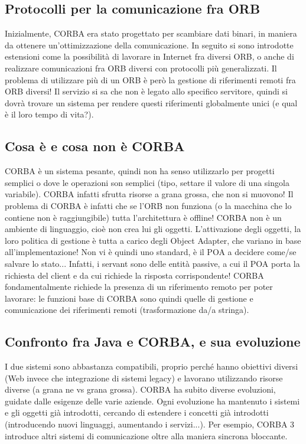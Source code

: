 \subsection{Protocolli per la comunicazione fra ORB}
Inizialmente, CORBA era stato progettato per scambiare dati binari, in maniera da ottenere un'ottimizzazione della
comunicazione. In seguito si sono introdotte estensioni come la possibilità di lavorare in Internet fra diversi ORB, o
anche di realizzare comunicazioni fra ORB diversi con protocolli più generalizzati.
Il problema di utilizzare più di un ORB è però la gestione di riferimenti remoti fra ORB diversi! Il servizio si sa
che non è legato allo specifico servitore, quindi si dovrà trovare un sistema per rendere questi riferimenti
globalmente unici (e qual è il loro tempo di vita?).
\subsection{Cosa è e cosa non è CORBA}
CORBA è un sistema pesante, quindi non ha senso utilizzarlo per progetti semplici o dove le operazioni son semplici
(tipo, settare il valore di una singola variabile). CORBA infatti sfrutta risorse a grana grossa, che non si muovono!
Il problema di CORBA è infatti che se l'ORB non funziona (o la macchina che lo contiene non è raggiungibile) tutta
l'architettura è offline!
CORBA non è un ambiente di linguaggio, cioè non crea lui gli oggetti. L'attivazione degli oggetti, la loro politica di
gestione è tutta a carico degli Object Adapter, che variano in base all'implementazione! Non vi è quindi uno standard, è
il POA a decidere come/se salvare lo stato... Infatti, i servant sono delle entità passive, a cui il POA porta la
richiesta del client e da cui richiede la risposta corrispondente!
CORBA fondamentalmente richiede la presenza di un riferimento remoto per poter lavorare: le funzioni base di CORBA sono
quindi quelle di gestione e comunicazione dei riferimenti remoti (trasformazione da/a stringa).
\subsection{Confronto fra Java e CORBA, e sua evoluzione}
I due sistemi sono abbastanza compatibili, proprio perché hanno obiettivi diversi (Web invece che integrazione di
sistemi legacy) e lavorano utilizzando risorse diverse (a grana ne vs grana grossa).
CORBA ha subito diverse evoluzioni, guidate dalle esigenze delle varie aziende.
Ogni evoluzione ha mantenuto i sistemi e gli oggetti già introdotti, cercando di estendere i concetti già introdotti
(introducendo nuovi linguaggi, aumentando i servizi...). Per esempio, CORBA 3 introduce altri sistemi di
comunicazione oltre alla maniera sincrona bloccante.
